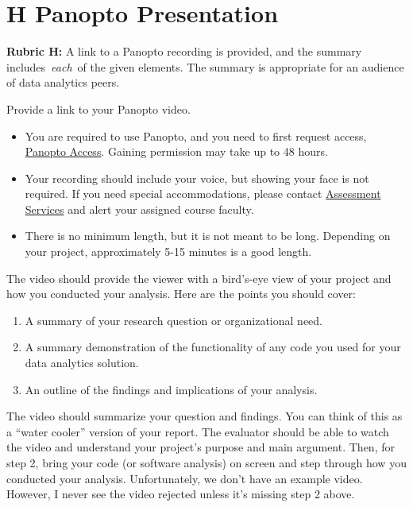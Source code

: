 \hypertarget{h-panopto-presentation}{%
\section{H Panopto Presentation}\label{h-panopto-presentation}}

\textbf{Rubric H:} A link to a Panopto recording is provided, and the
summary includes~\emph{each}~of the given elements. The summary is
appropriate for an audience of data analytics peers.

Provide a link to your Panopto video.

\begin{itemize}
\item
  You are required to use Panopto, and you need to first request access,
  \href{https://wgu.hosted.panopto.com/}{Panopto Access}. Gaining
  permission may take up to 48 hours.
\item
  Your recording should include your voice, but showing your face is not
  required. If you need special accommodations, please contact
  \href{mailto:assessmentservices@wgu.edu?subject=D195\%20task\%203\%20Panopto\%20Video}{Assessment
  Services} and alert your assigned course faculty.
\item
  There is no minimum length, but it is not meant to be long. Depending
  on your project, approximately 5-15 minutes is a good length.
\end{itemize}

The video should provide the viewer with a bird's-eye view of your
project and how you conducted your analysis. Here are the points you
should cover:

\begin{enumerate}
\def\labelenumi{\arabic{enumi}.}
\item
  A summary of your research question or organizational need.
\item
  A summary demonstration of the functionality of any code you used for
  your data analytics solution.
\item
  An outline of the findings and implications of your analysis.
\end{enumerate}

The video should summarize your question and findings. You can think of
this as a ``water cooler'' version of your report. The evaluator should
be able to watch the video and understand your project's purpose and
main argument. Then, for step 2, bring your code (or software analysis)
on screen and step through how you conducted your analysis.
Unfortunately, we don't have an example video. However, I never see the
video rejected unless it's missing step 2 above.\\
\hspace*{0.333em}

